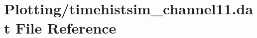 \hypertarget{Plotting_2timehistsim__channel11_8dat}{}\section{Plotting/timehistsim\+\_\+channel11.dat File Reference}
\label{Plotting_2timehistsim__channel11_8dat}
